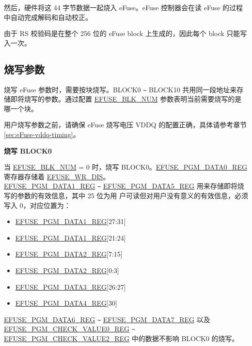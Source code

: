 \documentclass[main\_\_CN.tex]{subfiles}
\begin{document}
然后，硬件将这 44 字节数据一起烧入 eFuse。eFuse 控制器会在读 eFuse 的过程中自动完成解码和自动校正。

由于 RS 校验码是在整个 256 位的 eFuse block 上生成的，因此每个 block 只能写入一次。

\subsection{烧写参数}
\label{sec:efuse-para-software-programming}


烧写 eFuse 参数时，需要按块烧写。BLOCK0 \verb+~+ BLOCK10 共用同一段地址来存储即将烧写的参数。通过配置 \hyperref[fielddesc:EFUSEBLKNUM]{EFUSE\_BLK\_NUM} 参数表明当前需要烧写的是哪一个块。

用户烧写参数之前，请确保 eFuse 烧写电压 VDDQ 的配置正确，具体请参考章节 \ref{sec:eFuse-vddq-timing}。

{\bfseries 烧写 BLOCK0}
\label{sec:block0_hw_bits}

当 \hyperref[fielddesc:EFUSEBLKNUM]{EFUSE\_BLK\_NUM} = 0 时，烧写 BLOCK0。\hyperref[regdesc:EFUSEPGMDATA0REG]{EFUSE\_PGM\_DATA0\_REG} 寄存器存储着 \hyperref[fielddesc:EFUSEWRDIS]{EFUSE\_WR\_DIS}。\\ \hyperref[regdesc:EFUSEPGMDATA1REG]{EFUSE\_PGM\_DATA1\_REG} \verb+~+ \hyperref[regdesc:EFUSEPGMDATA5REG]{EFUSE\_PGM\_DATA5\_REG} 用来存储即将烧写的参数的有效信息，其中 25 位为用 户可读但对用户没有意义的有效信息，必须写入 0，对应位置为：

\begin{itemize}
    \item \hyperref[regdesc:EFUSEPGMDATA1REG]{EFUSE\_PGM\_DATA1\_REG}[27:31]
    \item \hyperref[regdesc:EFUSEPGMDATA1REG]{EFUSE\_PGM\_DATA1\_REG}[21:24]
    \item \hyperref[regdesc:EFUSEPGMDATA2REG]{EFUSE\_PGM\_DATA2\_REG}[7:15]
    \item \hyperref[regdesc:EFUSEPGMDATA2REG]{EFUSE\_PGM\_DATA2\_REG}[0:3]
    \item \hyperref[regdesc:EFUSEPGMDATA3REG]{EFUSE\_PGM\_DATA3\_REG}[26:27]
    \item \hyperref[regdesc:EFUSEPGMDATA4REG]{EFUSE\_PGM\_DATA4\_REG}[30]
\end{itemize}


\hyperref[regdesc:EFUSEPGMDATA6REG]{EFUSE\_PGM\_DATA6\_REG} \verb+~+ \hyperref[regdesc:EFUSEPGMDATA7REG]{EFUSE\_PGM\_DATA7\_REG} 以及 \hyperref[regdesc:EFUSEPGMCHECKVALUE0REG]{EFUSE\_PGM\_CHECK\_VALUE0\_REG} \verb+~+ \\\hyperref[regdesc:EFUSEPGMCHECKVALUE2REG]{EFUSE\_PGM\_CHECK\_VALUE2\_REG} 中的数据不影响 BLOCK0 的烧写。
\end{document}

